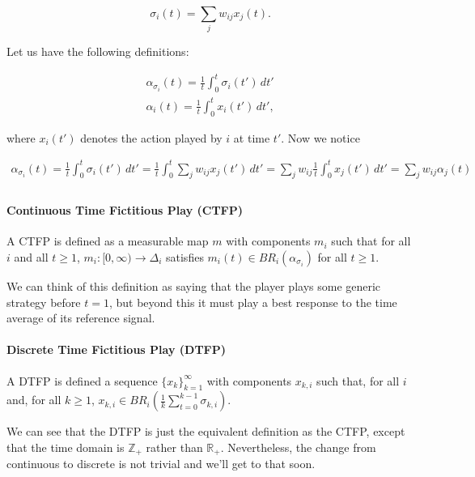 \documentclass{article}
\theoremstyle{definition}
\begin{document}
	\begin{equation*}
		\sigma_i (t) = \sum_{j} w_{ij} x_j (t).
	\end{equation*}
	
	Let us have the following definitions:
	
	\begin{align}
		\alpha_{\sigma_i}(t) = \frac{1}{t} \int_{0}^{t} \sigma_i(t') \, dt'\nonumber \\
		\alpha_i(t) = \frac{1}{t} \int_{0}^{t} x_i(t') \, dt', \nonumber
	\end{align}
	
	where $x_i(t')$ denotes the action played by $i$ at time $t'$. Now we notice
	
	\begin{align}
		\alpha_{\sigma_i}(t) = \frac{1}{t} \int_{0}^{t} \sigma_i(t') \, dt' = \frac{1}{t} \int_{0}^t \sum_{j} w_{ij} x_j(t') \, dt' = \sum_{j} w_{ij} \frac{1}{t} \int_{0}^t x_j(t') \, dt' = \sum_{j} w_{ij} \alpha_j(t) \nonumber \\
	\end{align}
	
	\paragraph{Continuous Time Fictitious Play (CTFP)} A CTFP is defined as a measurable map $m$ with components $m_i$ such that for all $i$ and all $t \geq 1$, $m_i: [0, \infty) \rightarrow \Delta_i$ satisfies $m_i(t) \in BR_i(\alpha_{\sigma_i})$ for all $t \geq 1$.
	
	We can think of this definition as saying that the player plays some generic strategy before $t = 1$, but beyond this it must play a best response to the time average of its reference signal.
	
	\paragraph{Discrete Time Fictitious Play (DTFP)} A DTFP is defined a sequence $\{x_{k}\}_{k=1}^{\infty}$ with components $x_{k, i}$ such that, for all $i$ and, for all $k \geq 1$, $x_{k, i} \in BR_i\left( \frac{1}{k} \sum_{t = 0}^{k - 1} \sigma_{k, i} \right)$.
	
	We can see that the DTFP is just the equivalent definition as the CTFP, except that the time domain is $\mathbb{Z}_+$ rather than $\mathbb{R}_+$. Nevertheless, the change from continuous to discrete is not trivial and we'll get to that soon.
	
\end{document}

